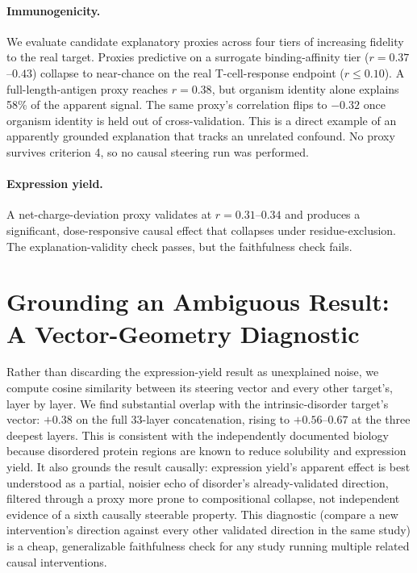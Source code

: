 \documentclass{article}
\begin{document}
\paragraph{Immunogenicity.} We evaluate candidate explanatory proxies
across four tiers of increasing fidelity to the real target. Proxies
predictive on a surrogate binding-affinity tier ($r=0.37$--$0.43$)
collapse to near-chance on the real T-cell-response endpoint
($r\leq0.10$). A full-length-antigen proxy reaches $r=0.38$, but organism
identity alone explains 58\% of the apparent signal. The same proxy's
correlation flips to $-0.32$ once organism identity is held out of
cross-validation. This is a direct example of an apparently grounded
explanation that tracks an unrelated confound. No proxy survives
criterion 4, so no causal steering run was performed.

\paragraph{Expression yield.} A net-charge-deviation proxy validates at
$r=0.31$--$0.34$ and produces a significant, dose-responsive causal effect
that collapses under residue-exclusion. The explanation-validity check
passes, but the faithfulness check fails.

\section{Grounding an Ambiguous Result: A Vector-Geometry Diagnostic}
\label{sec:cases}

Rather than discarding the expression-yield result as unexplained noise,
we compute cosine similarity between its steering vector and every other
target's, layer by layer. We find substantial overlap with the
intrinsic-disorder target's vector: $+0.38$ on the full 33-layer
concatenation, rising to $+0.56$--$0.67$ at the three deepest layers. This
is consistent with the independently documented biology because
disordered protein regions are known to reduce solubility and expression
yield. It also grounds the result causally: expression yield's apparent effect is
best understood as a partial, noisier echo of disorder's already-validated
direction, filtered through a proxy more prone to compositional collapse,
not independent evidence of a sixth causally steerable property. This
diagnostic (compare a new intervention's direction against every other
validated direction in the same study) is a cheap, generalizable
faithfulness check for any study running multiple related causal
interventions.
\end{document}
